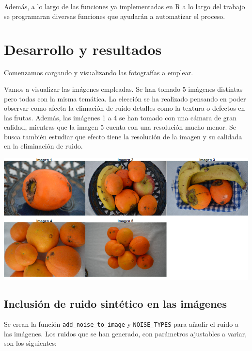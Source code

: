 \documentclass[
]{article}
\begin{document}
Además, a lo largo de las funciones ya implementadas en R a lo largo del
trabajo se programaran diversas funciones que ayudarán a automatizar el
proceso.

\section{Desarrollo y resultados}\label{desarrollo-y-resultados}

Comenzamos cargando y visualizando las fotografías a emplear.

Vamos a visualizar las imágenes empleadas. Se han tomado 5 imágenes
distintas pero todas con la misma temática. La elección se ha realizado
pensando en poder observar como afecta la elimación de ruido detalles
como la textura o defectos en las frutas. Además, las imágenes 1 a 4 se
han tomado con una cámara de gran calidad, mientras que la imagen 5
cuenta con una resolución mucho menor. Se busca también estudiar que
efecto tiene la resolución de la imagen y su calidada en la eliminación
de ruido.

\begin{center}\includegraphics[width=1\linewidth]{imwd/all_images} \end{center}

\subsection{Inclusión de ruido sintético en las
imágenes}\label{inclusiuxf3n-de-ruido-sintuxe9tico-en-las-imuxe1genes}

Se crean la función \texttt{add\_noise\_to\_image} y
\texttt{NOISE\_TYPES} para añadir el ruido a las imágenes. Los ruidos
que se han generado, con parámetros ajustables a variar, son los
siguientes:
\end{document}
